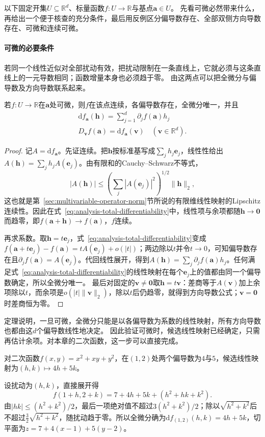 以下固定开集$U\subseteq\mathbb R^d$、标量函数$f:U\to\mathbb R$与基点$\bm a\in U$。
先看可微必然带来什么，再给出一个便于核查的充分条件，最后用反例区分偏导数存在、全部双侧方向导数存在、可微和连续可微。

\paragraph{可微的必要条件}
若同一个线性近似对全部扰动有效，把扰动限制在一条直线上，它就必须与这条直线上的一元导数相同；函数增量本身也必须趋于零。
由这两点可以把全微分与偏导数及方向导数联系起来。
\begin{theorem}
\label{thm:multivariable-differentiable-necessary}
若$f:U\to\mathbb R$在$\bm a$处可微，则$f$在该点连续，各偏导数存在，全微分唯一，并且
\[
 \begin{gathered}
\mathrm df_{\bm a}(\bm h)=\sum_{j=1}^d\partial_jf(\bm a)h_j\\
D_{\bm v}f(\bm a)=\mathrm df_{\bm a}(\bm v)
 \quad(\bm v\in\mathbb R^d).
 \end{gathered}
\]
\end{theorem}
\begin{proof}
记$A=\mathrm df_{\bm a}$。先证连续。把$\bm h$按标准基写成$\sum_jh_j\bm e_j$，线性性给出$A(\bm h)=\sum_jh_jA(\bm e_j)$。由有限和的Cauchy--Schwarz不等式，
\[
 |A(\bm h)|\leq\left(\sum_j|A(\bm e_j)|^2\right)^{1/2}\lVert\bm h\rVert_2,
\]
这也就是第~\ref{sec:multivariable-operator-norm}节所说的有限维线性映射的Lipschitz连续性。因此在式~\eqref{eq:analysis-total-differentiability}中，线性项与余项都随$\bm h\to\bm 0$而趋零，即$f(\bm a+\bm h)\to f(\bm a)$，$f$连续。

再求系数。取$\bm h=t\bm e_j$，式~\eqref{eq:analysis-total-differentiability}变成$f(\bm a+t\bm e_j)-f(\bm a)=tA(\bm e_j)+o(|t|)$；两边除以$t$并令$t\to0$，可知偏导数存在且$\partial_jf(\bm a)=A(\bm e_j)$。代回线性展开，得到$A(\bm h)=\sum_j\partial_jf(\bm a)h_j$。任何满足式~\eqref{eq:analysis-total-differentiability}的线性映射在每个$\bm e_j$上的值都由同一个偏导数确定，所以全微分唯一。
最后对固定的$\bm v\neq\bm0$取$\bm h=t\bm v$：差商等于$A(\bm v)$加上余项除以$t$，而余项是$o(|t|\lVert\bm v\rVert_2)$，除以$t$后仍趋零，就得到方向导数公式；$\bm v=\bm0$时差商恒为零。
\end{proof}
定理说明，一旦可微，全微分只能是以各偏导数为系数的线性映射，所有方向导数也都由这$d$个偏导数线性地决定。
因此验证可微时，候选线性映射已经确定，只需再估计余项。对本章的二次函数，这一步可以直接完成。
\begin{example}[二元二次函数的全微分]
\label{ex:multivariable-quadratic-differential}
对二次函数$f(x,y)=x^2+xy+y^2$，在$(1,2)$处两个偏导数为$4$与$5$，候选线性映射为$(h,k)\mapsto4h+5k$。

设扰动为$(h,k)$，直接展开得
\[
 f(1+h,2+k)=7+4h+5k+(h^2+hk+k^2).
\]
由$|hk|\leq(h^2+k^2)/2$，最后一项绝对值不超过$3(h^2+k^2)/2$；除以$\sqrt{h^2+k^2}$后不超过$\tfrac32\sqrt{h^2+k^2}$，随扰动趋于零。所以全微分确为$\mathrm df_{(1,2)}(h,k)=4h+5k$，切平面为$z=7+4(x-1)+5(y-2)$。
\end{example}

